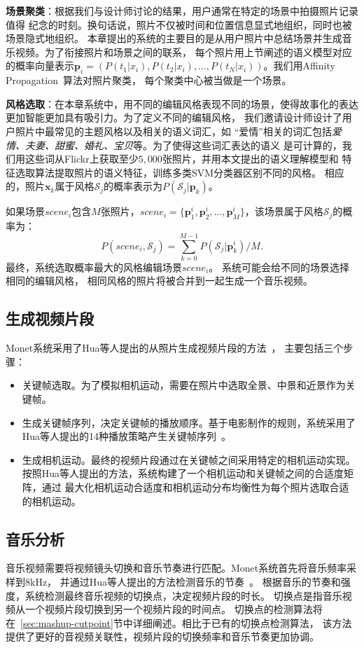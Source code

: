\documentclass[doctor]{ustcthesis}
\def \p {\mathbf{p}}
\def \x {\mathbf{x}}
\def \S {\mathcal{S}}
\begin{document}
\textbf{场景聚类}：根据我们与设计师讨论的结果，用户通常在特定的场景中拍摄照片记录值得
纪念的时刻。换句话说，照片不仅被时间和位置信息显式地组织，同时也被场景隐式地组织。
本章提出的系统的主要目的是从用户照片中总结场景并生成音乐视频。为了衔接照片和场景之间的联系，
每个照片用上节阐述的语义模型对应的概率向量表示$\p_i = (P(t_1|x_i), P(t_2|x_i), \ldots,
P(t_N | x_i))$。我们用Affinity Propagation~\cite{frey2007clustering}算法对照片聚类，
每个聚类中心被当做是一个场景。

\textbf{风格选取}：在本章系统中，用不同的编辑风格表现不同的场景，使得故事化的表达
更加智能更加具有吸引力。为了定义不同的编辑风格，
我们邀请设计师设计了用户照片中最常见的主题风格以及相关的语义词汇，如
``爱情''相关的词汇包括\emph{爱情、夫妻、甜蜜、婚礼、宝贝}等。为了使得这些词汇表达的语义
是可计算的，我们用这些词从Flickr上获取至少$5,000$张照片，并用本文提出的语义理解模型和
特征选取算法提取照片的语义特征，训练多类SVM分类器区别不同的风格。
相应的，照片$\x_k$属于风格$\S_j$的概率表示为$P(\S_j|\p_k)$。

如果场景$scene_i$包含$M$张照片，$scene_i = \{\p_1^i, \p_2^i, \ldots,
\p_M^i\}$，该场景属于风格$\S_j$的概率为：
\begin{equation}
    P(scene_i, \mathcal{S}_j)= \sum_{k=0}^{M-1} P(\mathcal{S}_j|\textbf{p}_k^i) / M.
\end{equation}
最终，系统选取概率最大的风格编辑场景$scene_i$。
系统可能会给不同的场景选择相同的编辑风格，
相同风格的照片将被合并到一起生成一个音乐视频。

\subsection{生成视频片段}
Monet系统采用了Hua等人提出的从照片生成视频片段的方法~\cite{hua2006photo2video}，
主要包括三个步骤：
\begin{itemize}\setlength{\itemsep}{0pt}
    \item 关键帧选取。为了模拟相机运动，需要在照片中选取全景、中景和近景作为关键帧。
    \item 生成关键帧序列，决定关键帧的播放顺序。基于电影制作的规则，系统采用了
        Hua等人提出的14种播放策略产生关键帧序列~\cite{hua2006photo2video}。
    \item 生成相机运动。最终的视频片段通过在关键帧之间采用特定的相机运动实现。
        按照Hua等人提出的方法，系统构建了一个相机运动和关键帧之间的合适度矩阵，通过
        最大化相机运动合适度和相机运动分布均衡性为每个照片选取合适的相机运动。
\end{itemize}

\subsection{音乐分析}
音乐视频需要将视频镜头切换和音乐节奏进行匹配。Monet系统首先将音乐频率采样到8kHz，
并通过Hua等人提出的方法检测音乐的节奏~\cite{hua2006photo2video}。
根据音乐的节奏和强度，系统检测最终音乐视频的切换点，决定视频片段的时长。
切换点是指音乐视频从一个视频片段切换到另一个视频片段的时间点。
切换点的检测算法将在~\ref{sec:mashup-cutpoint}节中详细阐述。相比于已有的切换点检测算法，
该方法提供了更好的音视频关联性，视频片段的切换频率和音乐节奏更加协调。
\end{document}

